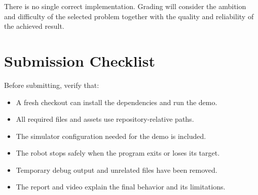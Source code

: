 \documentclass[11pt,a4paper]{article}
\begin{document}
\begin{notebox}
There is no single correct implementation. Grading will consider the ambition
and difficulty of the selected problem together with the quality and
reliability of the achieved result.
\end{notebox}

\section*{Submission Checklist}

Before submitting, verify that:

\begin{itemize}[label=$\square$]
    \item A fresh checkout can install the dependencies and run the demo.
    \item All required files and assets use repository-relative paths.
    \item The simulator configuration needed for the demo is included.
    \item The robot stops safely when the program exits or loses its target.
    \item Temporary debug output and unrelated files have been removed.
    \item The report and video explain the final behavior and its limitations.
\end{itemize}
\end{document}
